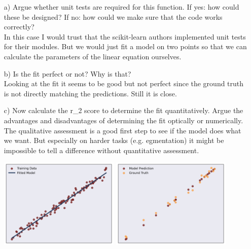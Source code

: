 \begin{enumerate}

\item[a)] Argue whether unit tests are required for this function. If yes: how could these be designed? If no: how could we make sure that the code works correctly? \\
In this case I would trust that the scikit-learn authors implemented unit tests for their modules. But we would just fit a model on two points so that we can calculate the parameters of the linear equation ourselves.

\item[b)] Is the fit perfect or not? Why is that? \\
Looking at the fit it seems to be good but not perfect since the ground truth is not directly matching the predictions. Still it is close.

\item[c)] Now calculate the r\_2 score to determine the fit quantitatively. Argue the advantages and disadvantages of determining the fit optically or numerically.\\
The qualitative assessment is a good first step to see if the model does what we want. But especially on harder tasks (e.g. egmentation) it might be impossible to tell a difference without quantitative assessment.

\includegraphics[width=0.45\textwidth]{source_code/goodfit_linear_model.png}
\includegraphics[width=0.45\textwidth]{source_code/goodfit_linear_testdata.png}

\end{enumerate}

